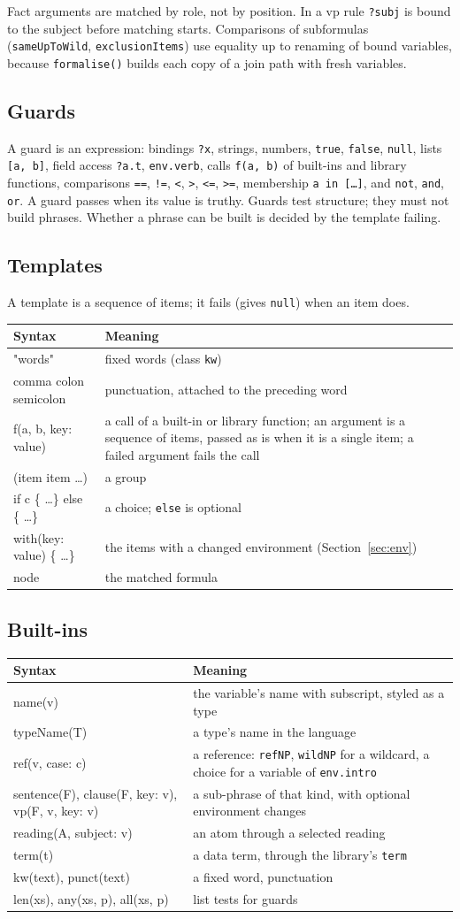 \documentclass[11pt, a4paper]{article}
\newcommand{\code}[1]{\texttt{\color{codefg}#1}}
\newenvironment{predtable}{%
  \begin{center}
  \begin{tabular}{>{\leavevmode\ttfamily\color{codefg}\raggedright\arraybackslash}p{0.38\textwidth} p{0.52\textwidth}}
  \toprule
  \normalfont\textbf{Syntax} & \textbf{Meaning} \\
  \midrule
}{%
  \bottomrule
  \end{tabular}
  \end{center}
}
\newcommand{\predrow}[2]{#1 & #2 \\[3pt]}
\begin{document}
Fact arguments are matched by role, not by position. In a vp rule
\code{?subj} is bound to the subject before matching starts. Comparisons of
subformulas (\code{sameUpToWild}, \code{exclusionItems}) use equality up to
renaming of bound variables, because \code{formalise()} builds each copy of a
join path with fresh variables.

\subsection{Guards}

A guard is an expression: bindings \code{?x}, strings, numbers,
\code{true}, \code{false}, \code{null}, lists \code{[a, b]}, field access
\code{?a.t}, \code{env.verb}, calls \code{f(a, b)} of built-ins and library
functions, comparisons \code{==}, \code{!=}, \code{<}, \code{>}, \code{<=},
\code{>=}, membership \code{a in [\ldots]}, and \code{not}, \code{and},
\code{or}. A guard passes when its value is truthy. Guards test structure;
they must not build phrases. Whether a phrase can be built is decided by the
template failing.

\subsection{Templates}

A template is a sequence of items; it fails (gives \code{null}) when an item
does.

\begin{predtable}
  \predrow{"words"}{fixed words (class \code{kw})}
  \predrow{comma colon semicolon}{punctuation, attached to the preceding word}
  \predrow{f(a, b, key: value)}{a call of a built-in or library function; an argument is a sequence of items, passed as is when it is a single item; a failed argument fails the call}
  \predrow{(item item \ldots)}{a group}
  \predrow{if c \{ \ldots \} else \{ \ldots \}}{a choice; \code{else} is optional}
  \predrow{with(key: value) \{ \ldots \}}{the items with a changed environment (Section~\ref{sec:env})}
  \predrow{node}{the matched formula}
\end{predtable}

\subsection{Built-ins}

\begin{predtable}
  \predrow{name(v)}{the variable's name with subscript, styled as a type}
  \predrow{typeName(T)}{a type's name in the language}
  \predrow{ref(v, case: c)}{a reference: \code{refNP}, \code{wildNP} for a wildcard, a choice for a variable of \code{env.intro}}
  \predrow{sentence(F), clause(F, key: v), vp(F, v, key: v)}{a sub-phrase of that kind, with optional environment changes}
  \predrow{reading(A, subject: v)}{an atom through a selected reading}
  \predrow{term(t)}{a data term, through the library's \code{term}}
  \predrow{kw(text), punct(text)}{a fixed word, punctuation}
  \predrow{len(xs), any(xs, p), all(xs, p)}{list tests for guards}
\end{predtable}
\end{document}
